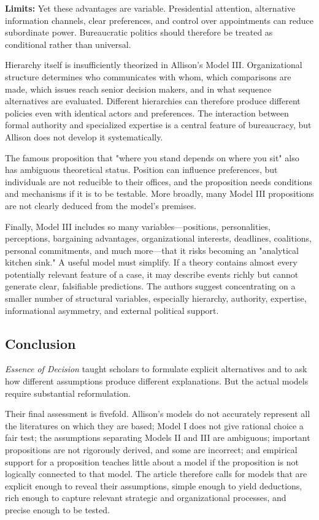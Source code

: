 \textbf{Limits:} Yet these advantages are variable. Presidential attention, alternative information channels, clear preferences, and control over appointments can reduce subordinate power. Bureaucratic politics should therefore be treated as conditional rather than universal.

Hierarchy itself is insufficiently theorized in Allison's Model III. Organizational structure determines who communicates with whom, which comparisons are made, which issues reach senior decision makers, and in what sequence alternatives are evaluated. Different hierarchies can therefore produce different policies even with identical actors and preferences. The interaction between formal authority and specialized expertise is a central feature of bureaucracy, but Allison does not develop it systematically.

The famous proposition that "where you stand depends on where you sit" also has ambiguous theoretical status. Position can influence preferences, but individuals are not reducible to their offices, and the proposition needs conditions and mechanisms if it is to be testable. More broadly, many Model III propositions are not clearly deduced from the model's premises.

Finally, Model III includes so many variables---positions, personalities, perceptions, bargaining advantages, organizational interests, deadlines, coalitions, personal commitments, and much more---that it risks becoming an "analytical kitchen sink." A useful model must simplify. If a theory contains almost every potentially relevant feature of a case, it may describe events richly but cannot generate clear, falsifiable predictions. The authors suggest concentrating on a smaller number of structural variables, especially hierarchy, authority, expertise, informational asymmetry, and external political support.

\subsection{Conclusion}
\emph{Essence of Decision} taught scholars to formulate explicit alternatives and to ask how different assumptions produce different explanations. But the actual models require substantial reformulation.

Their final assessment is fivefold. Allison's models do not accurately represent all the literatures on which they are based; Model I does not give rational choice a fair test; the assumptions separating Models II and III are ambiguous; important propositions are not rigorously derived, and some are incorrect; and empirical support for a proposition teaches little about a model if the proposition is not logically connected to that model. The article therefore calls for models that are explicit enough to reveal their assumptions, simple enough to yield deductions, rich enough to capture relevant strategic and organizational processes, and precise enough to be tested.

